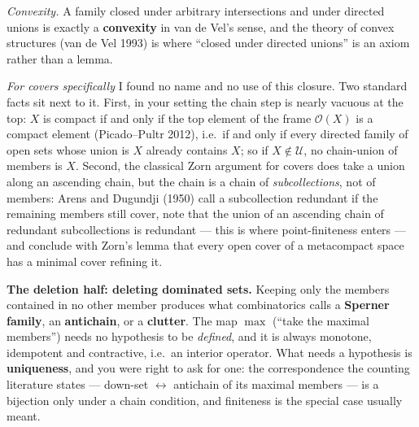 \documentclass[
]{article}
\begin{document}
\emph{Convexity.} A family closed under arbitrary intersections and
under directed unions is exactly a \textbf{convexity} in van de Vel's
sense, and the theory of convex structures (van de Vel 1993) is where
``closed under directed unions'' is an axiom rather than a lemma.

\emph{For covers specifically} I found no name and no use of this
closure. Two standard facts sit next to it. First, in your setting the
chain step is nearly vacuous at the top: \(X\) is compact if and only if
the top element of the frame \(\mathcal O(X)\) is a compact element
(Picado--Pultr 2012), i.e.~if and only if every directed family of open
sets whose union is \(X\) already contains \(X\); so if
\(X\notin\mathcal U\), no chain-union of members is \(X\). Second, the
classical Zorn argument for covers does take a union along an ascending
chain, but the chain is a chain of \emph{subcollections}, not of
members: Arens and Dugundji (1950) call a subcollection redundant if the
remaining members still cover, note that the union of an ascending chain
of redundant subcollections is redundant --- this is where
point-finiteness enters --- and conclude with Zorn's lemma that every
open cover of a metacompact space has a minimal cover refining it.

\textbf{The deletion half: deleting dominated sets.} Keeping only the
members contained in no other member produces what combinatorics calls a
\textbf{Sperner family}, an \textbf{antichain}, or a \textbf{clutter}.
The map \(\max\) (``take the maximal members'') needs no hypothesis to
be \emph{defined}, and it is always monotone, idempotent and
contractive, i.e.~an interior operator. What needs a hypothesis is
\textbf{uniqueness}, and you were right to ask for one: the
correspondence the counting literature states --- down-set
\(\leftrightarrow\) antichain of its maximal members --- is a bijection
only under a chain condition, and finiteness is the special case usually
meant.
\end{document}
